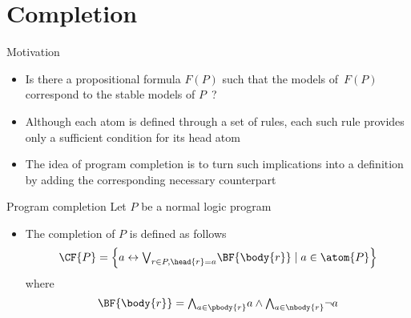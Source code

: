 \section{Completion}
\begin{frame}{Motivation}
  \bigskip
  \begin{itemize}
  \item<1-> 
    Is there a propositional formula $F(P)$ such that the models of~$F(P)$ correspond to the
    stable models of $P$~?
    \bigskip
  \item<2-> 
    Although each atom is defined through a set of rules,
    each such rule provides only a \alert{sufficient} condition for its head atom
    \medskip
  \item<3-> 
    The idea of program completion is to turn such implications into a definition
    by adding the corresponding \alert{necessary} counterpart
  \end{itemize}
\end{frame}
\begin{frame}{Program completion}
  Let $P$ be a normal logic program
  \bigskip
  \begin{itemize}
  \item
    The \alert{completion}  of $P$ is defined as follows
    \[
    \CF{P}
    =
    \left\{a \leftrightarrow \textstyle{\bigvee_{r\in P, \head{r} = a}} \BF{\body{r}} \mid a\in\atom{P}\right\}
    \]
    where
    \[
    \BF{\body{r}}
    =
    \textstyle{\bigwedge_{a\in\pbody{r}}}      a
    \wedge
    \textstyle{\bigwedge_{a\in\nbody{r}}} \neg a
    \]
  \end{itemize}
\end{frame}
